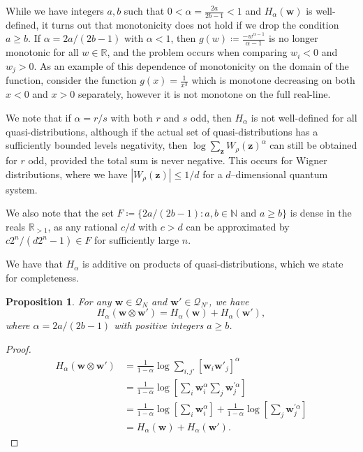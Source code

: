 \documentclass[
twocolumn,
superscriptaddress
]{revtex4-1}
\newtheorem{proposition}[theorem]{Proposition}
\def\z{\boldsymbol{z}}
\def\w{\boldsymbol{w}}
\begin{document}
While we have integers $a,b$ such that $0 < \alpha=\frac{2a}{2b-1} < 1$ and $H_\alpha(\w)$ is well-defined, it turns out that monotonicity does not hold if we drop the condition $a \ge b$. If $\alpha =2a/(2b-1)$ with $\alpha < 1$, then $g(w) \coloneqq \frac{-w^{\alpha-1}}{\alpha-1}$ is no longer monotonic for all $w \in \mathbb{R}$, and the problem occurs when comparing $w_i < 0$ and $w_j >0$. As an example of this dependence of monotonicity on the domain of the function, consider the function $g(x) = \frac{1}{x^3}$ which is monotone decreasing on both $x<0$ and $x>0$ separately, however it is not monotone on the full real-line.

We note that if $\alpha =r/s$ with both $r$ and $s$ odd, then $H_\alpha$ is not well-defined for all quasi-distributions, although if the actual set of quasi-distributions has a sufficiently bounded levels negativity, then $\log \sum_{\z} W_\rho(\z)^\alpha$ can still be obtained for $r$ odd, provided the total sum is never negative. This occurs for Wigner distributions, where we have $|W_\rho(\z)| \leq 1/d$ for a $d$--dimensional quantum system.

We also note that the set $F \coloneqq \{2a/(2b-1): a,b \in \mathbb{N} \text{ and } a \geq b\}$ is dense in the reals $\mathbb{R}_{>1}$, as any rational $c/d$ with $c>d$ can be approximated by  $c2^n / (d2^n-1) \in F$ for sufficiently large $n$.

We have that $H_{\alpha}$ is additive on products of quasi-distributions, which we state for completeness.
\begin{proposition}\label{H_add}
	For any $\w \in \mathcal{Q}_N$ and $\w' \in \mathcal{Q}_{N'}$, we have
	\begin{equation}
		H_{\alpha}(\w\otimes \w') = H_{\alpha}(\w) + H_{\alpha}(\w'),
	\end{equation}
	where $\alpha = 2a/(2b-1)$ with positive integers $a\ge b$.
\end{proposition}
\begin{proof}
	\begin{align}
		H_{\alpha}(\w \otimes \w') &= \frac{1}{1-\alpha}\log \sum_{i,j'} \left[\w_i \w'_j\right]^{\alpha} \nonumber\\
		&= \frac{1}{1-\alpha}\log  \left [ \sum_i\w_i^\alpha \sum_j\w_j^{\prime \alpha} \right ] \nonumber\\
				&= \frac{1}{1-\alpha}\log  \left [ \sum_i\w_i^\alpha\right ] + \frac{1}{1-\alpha}\log \left [ \sum_j\w_j^{\prime \alpha} \right ] \nonumber\\
		&= H_{\alpha}(\w) + H_{\alpha}(\w').
	\end{align}
\end{proof}
\end{document}

